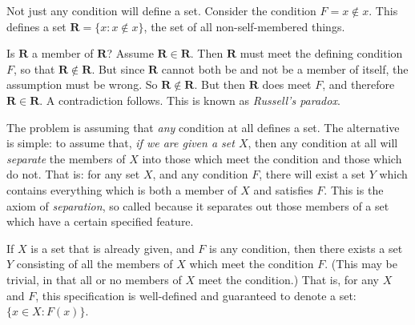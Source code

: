  Not just any condition will define a set. Consider the condition $F = x \notin x$. This defines a set $\mathbf{R} = \{x: x\notin x\}$, the set of all non-self-membered things.

 Is $\mathbf{R}$ a member of $\mathbf{R}$? Assume $\mathbf{R} \in \mathbf{R}$. Then $\mathbf{R}$ must meet the defining condition $F$, so that $\mathbf{R} \notin \mathbf{R}$. But since $\mathbf{R}$ cannot both be and not be a member of itself, the assumption must be wrong. So $\mathbf{R}\notin \mathbf{R}$. But then $\mathbf{R}$ does meet $F$, and therefore $\mathbf{R} \in \mathbf{R}$. A contradiction follows. This is known as \emph{Russell's paradox}\label{russ}.

The problem is assuming that \emph{any} condition at all defines a set. The alternative is simple: to assume that, \emph{if we are given a set $X$}, then any condition at all will \emph{separate} the members of $X$ into those which meet the condition and those which do not. That is: for any set $X$, and any condition $F$, there will exist a set $Y$ which contains everything which is both a member of $X$ and satisfies $F$. This is the axiom of \emph{separation}, so called because it separates out those members of a set which have a certain specified feature.\begin{axiom}[Separation]
	If $X$ is a set that is already given, and $F$ is any condition, then there exists a set $Y$ consisting of all the members of $X$ which meet the condition $F$. (This may be trivial, in that all or no members of $X$ meet the condition.) That is, for any $X$ and $F$, this specification is well-defined and guaranteed to denote a set: $\{x\in X: F(x)\}$.
\end{axiom}


